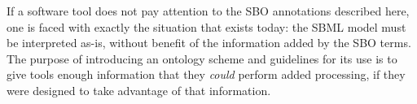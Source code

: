 If a software tool does not pay attention to the SBO
annotations described here, one is faced with exactly the
situation that exists today: the SBML model must be interpreted
as-is, without benefit of the information added by the SBO terms.
The purpose of introducing an ontology scheme and guidelines for
its use is to give tools enough information that they \emph{could}
perform added processing, if they were designed to take advantage
of that information.
% 
% 
% 
